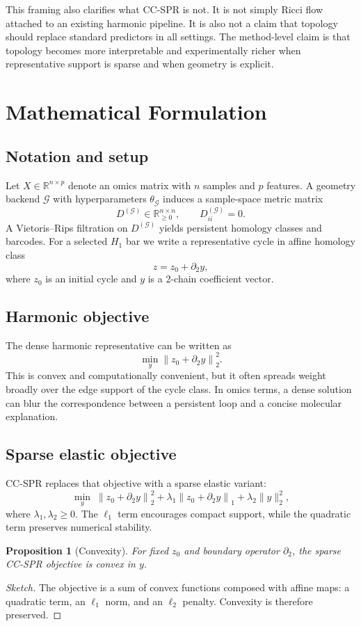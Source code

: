 \documentclass[11pt]{article}
\newtheorem{proposition}{Proposition}
\begin{document}
This framing also clarifies what CC-SPR is not. It is not simply Ricci flow attached to an existing harmonic pipeline. It is also not a claim that topology should replace standard predictors in all settings. The method-level claim is that topology becomes more interpretable and experimentally richer when representative support is sparse and when geometry is explicit.

\section{Mathematical Formulation}
\subsection{Notation and setup}
Let $X \in \mathbb{R}^{n \times p}$ denote an omics matrix with $n$ samples and $p$ features. A geometry backend $\mathcal{G}$ with hyperparameters $\theta_{\mathcal{G}}$ induces a sample-space metric matrix
\[
D^{(\mathcal{G})} \in \mathbb{R}_{\ge 0}^{n \times n}, \qquad D^{(\mathcal{G})}_{ii}=0.
\]
A Vietoris--Rips filtration on $D^{(\mathcal{G})}$ yields persistent homology classes and barcodes. For a selected $H_1$ bar we write a representative cycle in affine homology class
\[
z = z_0 + \partial_2 y,
\]
where $z_0$ is an initial cycle and $y$ is a 2-chain coefficient vector.

\subsection{Harmonic objective}
The dense harmonic representative can be written as
\[
\min_y \left\| z_0 + \partial_2 y \right\|_2^2.
\]
This is convex and computationally convenient, but it often spreads weight broadly over the edge support of the cycle class. In omics terms, a dense solution can blur the correspondence between a persistent loop and a concise molecular explanation.

\subsection{Sparse elastic objective}
CC-SPR replaces that objective with a sparse elastic variant:
\[
\min_y \; \left\| z_0 + \partial_2 y \right\|_2^2 + \lambda_1 \left\| z_0 + \partial_2 y \right\|_1 + \lambda_2 \|y\|_2^2,
\]
where $\lambda_1,\lambda_2 \ge 0$. The $\ell_1$ term encourages compact support, while the quadratic term preserves numerical stability.

\begin{proposition}[Convexity]
For fixed $z_0$ and boundary operator $\partial_2$, the sparse CC-SPR objective is convex in $y$.
\end{proposition}
\begin{proof}[Sketch]
The objective is a sum of convex functions composed with affine maps: a quadratic term, an $\ell_1$ norm, and an $\ell_2$ penalty. Convexity is therefore preserved.
\end{proof}
\end{document}
